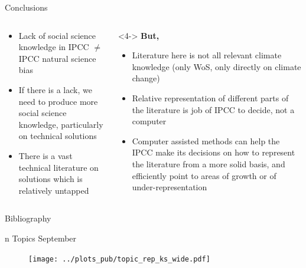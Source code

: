 \documentclass[9pt, aspectratio=169]{beamer}
\begin{document}
\begin{frame}{Conclusions}
\begin{columns}[t]
	\begin{column}{0.618\linewidth}
		\begin{itemize}
			\item<1-> Lack of social science knowledge in IPCC $ \neq $ IPCC natural science bias
			\item<2-> If there is a lack, we need to produce more social science knowledge, particularly on technical solutions
			\item<3-> There is a vast technical literature on solutions which is relatively untapped
		\end{itemize}
	
		\bigskip
		\bigskip
	\end{column}
	\begin{column}{0.382\linewidth}<4->
		\textbf{But,}
		\begin{itemize}
			\item<4-> Literature here is not all relevant climate knowledge (only WoS, only directly on climate change)
			\item<5-> Relative representation of different parts of the literature is job of IPCC to decide, not a computer
		\end{itemize}
		\begin{itemize}
			\item<6-> Computer assisted methods can help the IPCC make its decisions on how to represent the literature from a more solid basis, and efficiently point to areas of growth or of under-representation
		\end{itemize}
	\end{column}
\end{columns}
\end{frame}


\begin{frame}{Bibliography}
\scriptsize

\end{frame}




\appendix


\begin{frame}{n Topics}
\vspace{-0.4cm}September
\begin{figure}
	\texttt{[image: ../plots\_pub/topic\_rep\_ks\_wide.pdf]}
\end{figure}

\end{frame}

\end{document}
